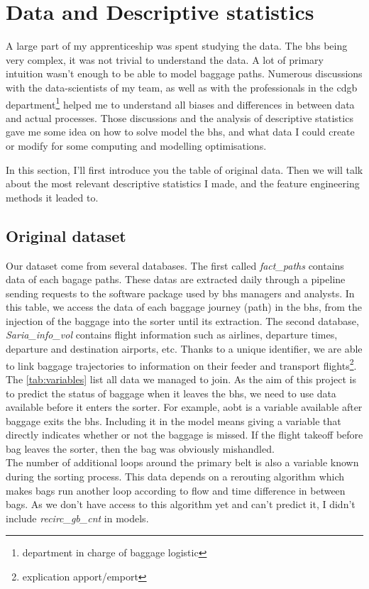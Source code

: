 \documentclass[12pt]{article}
\begin{document}
\cite{SchedulingBGF}
\cite{ImprovementofaSortationSystem}
\cite{Pillière}

\newpage


\section{Data and Descriptive statistics}

A large part of my apprenticeship was spent studying the data. The \acrlong{bhs} being very complex, it was not trivial to understand the data. A lot of primary intuition wasn't enough to be able to model baggage paths. Numerous discussions with the data-scientists of my team, as well as with the professionals in the \acrshort{cdgb} department\footnote{department in charge of baggage logistic} helped me to understand all biases and differences in between data and actual processes. Those discussions and the analysis of descriptive statistics gave me some idea on how to solve model the \acrshort{bhs}, and what data I could create or modify for some computing and modelling optimisations. 

In this section, I'll first introduce you the table of original data. Then we will talk about the most relevant descriptive statistics I made, and the feature engineering methods it leaded to.


\subsection{Original dataset}

Our dataset come from several databases. The first called \textit{fact\_paths} contains data of each bagage paths. These datas are extracted daily through a pipeline sending requests to the software package used by \acrshort{bhs} managers and analysts. In this table, we access the data of each baggage journey (path) in the \acrshort{bhs}, from the injection of the baggage into the sorter until its extraction.
The second database, \textit{Saria\_info\_vol} contains flight information such as airlines, departure times, departure and destination airports, etc. Thanks to a unique identifier, we are able to link baggage trajectories to information on their feeder and transport flights\footnote{explication apport/emport}. \hfill \break
\indent The \autoref{tab:variables} list all data we managed to join. As the aim of this project is to predict the status of baggage when it leaves the \acrshort{bhs}, we need to use data available before it enters the sorter. For example, \acrshort{aobt} is a variable available after baggage exits the \acrshort{bhs}. Including it in the model means giving a variable that directly indicates whether or not the baggage is missed. If the flight takeoff before bag leaves the sorter, then the bag was obviously mishandled.\\ 
The number of additional loops around the primary belt is also a variable known during the sorting process. This data depends on a rerouting algorithm which makes bags run another loop according to flow and time difference in between bags. As we don't have access to this algorithm yet and can't predict it, I didn't include \textit{recirc\_gb\_cnt} in models.
\end{document}
